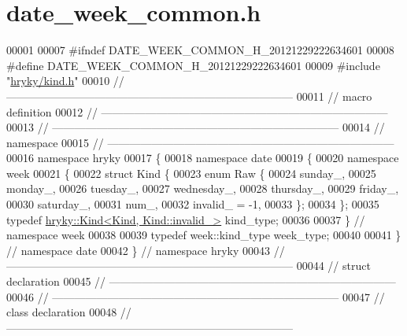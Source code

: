 \hypertarget{date__week__common_8h_source}{\section{date\-\_\-week\-\_\-common.\-h}
}

\begin{DoxyCode}
00001 
00007 \textcolor{preprocessor}{#ifndef DATE\_WEEK\_COMMON\_H\_20121229222634601}
00008 \textcolor{preprocessor}{}\textcolor{preprocessor}{#define DATE\_WEEK\_COMMON\_H\_20121229222634601}
00009 \textcolor{preprocessor}{}\textcolor{preprocessor}{#include "\hyperlink{kind_8h}{hryky/kind.h}"}
00010 \textcolor{comment}{//
      ------------------------------------------------------------------------------}
00011 \textcolor{comment}{// macro definition}
00012 \textcolor{comment}{//
      ------------------------------------------------------------------------------}
00013 \textcolor{comment}{//
      ------------------------------------------------------------------------------}
00014 \textcolor{comment}{// namespace}
00015 \textcolor{comment}{//
      ------------------------------------------------------------------------------}
00016 \textcolor{keyword}{namespace }hryky
00017 \{
00018 \textcolor{keyword}{namespace }date
00019 \{
00020 \textcolor{keyword}{namespace }week
00021 \{
00022     \textcolor{keyword}{struct }Kind \{
00023         \textcolor{keyword}{enum} Raw \{
00024             sunday\_,
00025             monday\_,
00026             tuesday\_,
00027             wednesday\_,
00028             thursday\_,
00029             friday\_,
00030             saturday\_,
00031             num\_,
00032             invalid\_ = -1,
00033         \};
00034     \};
00035     \textcolor{keyword}{typedef} \hyperlink{classhryky_1_1_kind}{hryky::Kind<Kind, Kind::invalid_>} kind\_type;
00036     
00037 \} \textcolor{comment}{// namespace week}
00038 
00039     \textcolor{keyword}{typedef} week::kind\_type week\_type;
00040 
00041 \} \textcolor{comment}{// namespace date}
00042 \} \textcolor{comment}{// namespace hryky}
00043 \textcolor{comment}{//
      ------------------------------------------------------------------------------}
00044 \textcolor{comment}{// struct declaration}
00045 \textcolor{comment}{//
      ------------------------------------------------------------------------------}
00046 \textcolor{comment}{//
      ------------------------------------------------------------------------------}
00047 \textcolor{comment}{// class declaration}
00048 \textcolor{comment}{//
      ------------------------------------------------------------------------------}

\end{DoxyCode}
